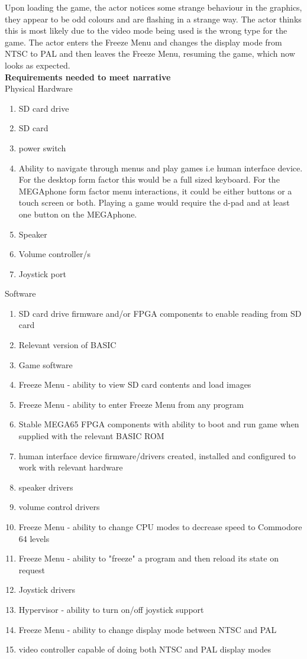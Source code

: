 Upon loading the game, the actor notices some strange behaviour in the graphics, they appear to be odd colours and are flashing in a strange way. The actor thinks this is most likely due to the video mode being used is the wrong type for the game. The actor enters the Freeze Menu and changes the display mode from NTSC to PAL and then leaves the Freeze Menu, resuming the game, which now looks as expected.\\

\textbf{Requirements needed to meet narrative}\\
Physical Hardware
\begin{enumerate}
\item SD card drive
\item SD card
\item power switch
\item Ability to navigate through menus and play games i.e human interface device. For the desktop form factor this would be a full sized keyboard. For the MEGAphone form factor menu interactions, it could be either buttons or a touch screen or both. Playing a game would require the d-pad and at least one button on the MEGAphone.
\item Speaker
\item Volume controller/s
\item Joystick port
\end{enumerate}

Software\\
\begin{enumerate}
\item SD card drive firmware and/or FPGA components to enable reading from SD card
\item Relevant version of BASIC 
\item Game software
\item Freeze Menu - ability to view SD card contents and load images
\item Freeze Menu - ability to enter Freeze Menu from any program
\item Stable MEGA65 FPGA components with ability to boot and run game when supplied with the relevant BASIC ROM
\item human interface device firmware/drivers created, installed and configured to work with relevant hardware
\item speaker drivers
\item volume control drivers 
\item Freeze Menu - ability to change CPU modes to decrease speed to Commodore 64 levels
\item Freeze Menu - ability to "freeze" a program and then reload its state on request
\item Joystick drivers
\item Hypervisor - ability to turn on/off joystick support
\item Freeze Menu - ability to change display mode between NTSC and PAL
\item video controller capable of doing both NTSC and PAL display modes
\end{enumerate}

